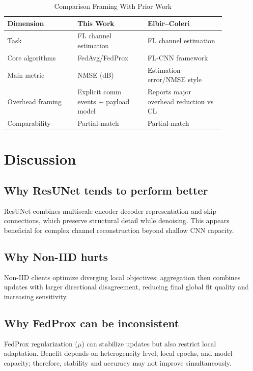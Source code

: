 \documentclass[onecolumn]{IEEEtran}
\begin{document}
\begin{table}[t]
\caption{Comparison Framing With Prior Work}
\label{tab:prior}
\centering
\begin{tabular}{p{0.28\linewidth}p{0.29\linewidth}p{0.31\linewidth}}
\toprule
Dimension & This Work & Elbir--Coleri~\cite{elbir2021flchannel} \\
\midrule
Task & FL channel estimation & FL channel estimation \\
Core algorithms & FedAvg/FedProx & FL-CNN framework \\
Main metric & NMSE (dB) & Estimation error/NMSE style \\
Overhead framing & Explicit comm events + payload model & Reports major overhead reduction vs CL \\
Comparability & Partial-match & Partial-match \\
\bottomrule
\end{tabular}
\end{table}

\section{Discussion}
\subsection{Why ResUNet tends to perform better}
ResUNet combines multiscale encoder-decoder representation and skip-connections, which preserve structural detail while denoising. This appears beneficial for complex channel reconstruction beyond shallow CNN capacity.

\subsection{Why Non-IID hurts}
Non-IID clients optimize diverging local objectives; aggregation then combines updates with larger directional disagreement, reducing final global fit quality and increasing sensitivity.

\subsection{Why FedProx can be inconsistent}
FedProx regularization ($\mu$) can stabilize updates but also restrict local adaptation. Benefit depends on heterogeneity level, local epochs, and model capacity; therefore, stability and accuracy may not improve simultaneously.
\end{document}
